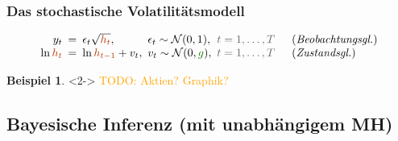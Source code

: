 \documentclass[10pt]{beamer}
\theoremstyle{definition}
\newtheorem*{bsp}{Beispiel}
\newcommand{\Normal}{\mathcal{N}} %
\newcommand{\TODO}[1]{\textcolor{orange}{TODO: #1}}
\newcommand{\stepOne}[1]{\textcolor{StepOneColor}{#1}}
\newcommand{\stepTwo}[1]{\textcolor{StepTwoColor}{#1}}
\newcommand{\typeInfo}[1]{\textcolor{TypeInfoColor}{#1}}
\begin{document}
\begin{frame}[t]
  \frametitle{Das stochastische Volatilitätsmodell}
  \begin{modelbox}
    \[
      \arraycolsep=2.5pt
      \begin{array}{rcllll}
        y_t &=& \epsilon_t \sqrt{\stepOne{h_t}}, & \epsilon_t \sim \Normal(0, 1), & \typeInfo{t = 1, \ldots, T} \quad & \text{(\emph{Beobachtungsgl.})} \\
        \ln \stepOne{h_t} &=& \ln \stepOne{h_{t-1}} + v_t, & v_t \sim \Normal(0, \stepTwo{g}), & \typeInfo{t = 1, \ldots, T} \quad & \text{(\emph{Zustandsgl.})}
      \end{array}
    \]
  \end{modelbox}

  \begin{bsp}<2->
    \TODO{Aktien? Graphik?}
  \end{bsp}
\end{frame}

\subsection{Bayesische Inferenz (mit unabhängigem MH)}
\end{document}
